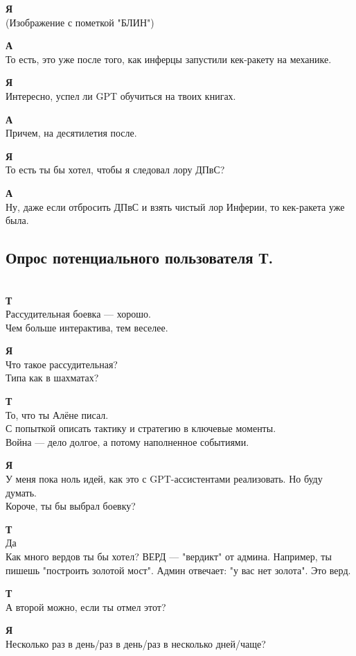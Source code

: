 \textbf{Я}\\
(Изображение с пометкой "БЛИН")

\textbf{А}\\
То есть, это уже после того, как инферцы запустили кек-ракету на механике.

\textbf{Я}\\
Интересно, успел ли GPT обучиться на твоих книгах.

\textbf{А}\\
Причем, на десятилетия после.

\textbf{Я}\\
То есть ты бы хотел, чтобы я следовал лору ДПвС?

\textbf{А}\\
Ну, даже если отбросить ДПвС и взять чистый лор Инферии, то кек-ракета уже была.

\subsection*{Опрос потенциального пользователя Т.}\\
\textbf{Т}\\
Рассудительная боевка — хорошо.\\
Чем больше интерактива, тем веселее.

\textbf{Я}\\
Что такое рассудительная?\\
Типа как в шахматах?

\textbf{Т}\\
То, что ты Алёне писал.\\
С попыткой описать тактику и стратегию в ключевые моменты.\\
Война — дело долгое, а потому наполненное событиями.

\textbf{Я}\\
У меня пока ноль идей, как это с GPT-ассистентами реализовать. Но буду думать.\\
Короче, ты бы выбрал боевку?

\textbf{Т}\\
Да\\
Как много вердов ты бы хотел? ВЕРД — "вердикт" от админа. Например, ты пишешь "построить золотой мост". Админ отвечает: "у вас нет золота". Это верд.

\textbf{Т}\\
А второй можно, если ты отмел этот?

\textbf{Я}\\
Несколько раз в день/раз в день/раз в несколько дней/чаще?

